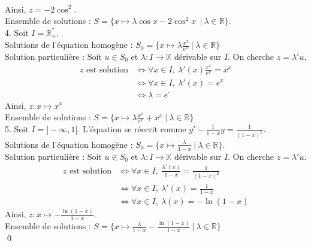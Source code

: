 \documentclass[10pt]{article}
\begin{document}
\begin{tcolorbox}[enhanced, width=7in, center, size=fbox, fontupper=\large, drop shadow southwest]
\begin{align*}
    \end{align*}
    Ainsi, $z=-2\cos^2$.\\
    Ensemble de solutions : $S = \{x\mapsto \lambda\cos x - 2\cos^2x\ ~ | ~ \lambda \in \mathbb{R}\}$.\\
    4. Soit $I=\mathbb{R}^*_+$.\\
    Solutions de l'équation homogène : $S_0=\{x\mapsto\lambda \frac{x^x}{e^x} ~ | ~ \lambda \in\mathbb{R}\}$\\
    Solution particulière : Soit $u\in S_0$ et $\lambda : I \rightarrow \mathbb{K}$ dérivable sur $I$. On cherche $z=\lambda'u$.
    \begin{align*}
        z \text{ est solution} &\iff \forall{x\in I}, ~ \lambda'(x)\frac{x^x}{e^x} = x^x\\
        &\iff \forall{x \in I}, ~ \lambda'(x) = e^x\\
        &\iff \lambda = e^\cdot
    \end{align*}
    Ainsi, $z:x \mapsto x^x$\\
    Ensemble de solutions : $S = \{x\mapsto \lambda\frac{x^x}{e^x} + x^x ~ | ~ \lambda \in \mathbb{R}\}$\\
    5. Soit $I=]-\infty,1[$. L'équation se réecrit comme $y' - \frac{1}{1-x}y = \frac{1}{(1-x)^2}$.\\
    Solutions de l'équation homogène : $S_0 = \{x\mapsto\frac{\lambda}{1-x} ~ | ~ \lambda\in\mathbb{R}\}$.\\
    Solution particulière : Soit $u\in S_0$ et $\lambda:I\rightarrow\mathbb{K}$ dérivable sur $I$. On cherche $z=\lambda'u$.
    \begin{align*}
        z \text{ est solution} &\iff \forall{x\in I}, ~ \frac{\lambda'(x)}{1-x} = \frac{1}{(1-x)^2}\\
        &\iff \forall{x\in I}, ~ \lambda'(x) = \frac{1}{1-x}\\
        &\iff \forall{x\in I}, ~ \lambda(x) = -\ln(1-x) 
    \end{align*} 
    Ainsi, $z:x\mapsto -\frac{\ln(1-x)}{1-x}$.\\
    Ensemble de solutions : $S = \{x \mapsto \frac{\lambda}{1-x} - \frac{\ln(1-x)}{1-x} ~ | ~ \lambda \in \mathbb{R}\}$\\
    \qed
\end{tcolorbox}

\end{document}
